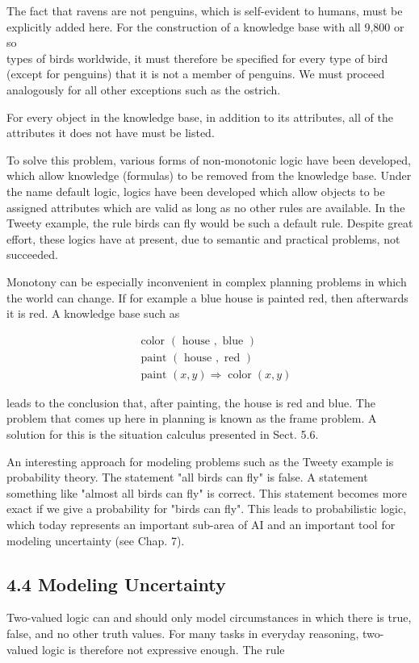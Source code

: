 \documentclass[10pt]{article}
\begin{document}
The fact that ravens are not penguins, which is self-evident to humans, must be explicitly added here. For the construction of a knowledge base with all 9,800 or so\\
types of birds worldwide, it must therefore be specified for every type of bird (except for penguins) that it is not a member of penguins. We must proceed analogously for all other exceptions such as the ostrich.

For every object in the knowledge base, in addition to its attributes, all of the attributes it does not have must be listed.

To solve this problem, various forms of non-monotonic logic have been developed, which allow knowledge (formulas) to be removed from the knowledge base. Under the name default logic, logics have been developed which allow objects to be assigned attributes which are valid as long as no other rules are available. In the Tweety example, the rule birds can fly would be such a default rule. Despite great effort, these logics have at present, due to semantic and practical problems, not succeeded.

Monotony can be especially inconvenient in complex planning problems in which the world can change. If for example a blue house is painted red, then afterwards it is red. A knowledge base such as

$$
\begin{aligned}
& \text { color }(\text { house }, \text { blue }) \\
& \text { paint }(\text { house }, \text { red }) \\
& \text { paint }(x, y) \Rightarrow \operatorname{color}(x, y)
\end{aligned}
$$

leads to the conclusion that, after painting, the house is red and blue. The problem that comes up here in planning is known as the frame problem. A solution for this is the situation calculus presented in Sect. 5.6.

An interesting approach for modeling problems such as the Tweety example is probability theory. The statement "all birds can fly" is false. A statement something like "almost all birds can fly" is correct. This statement becomes more exact if we give a probability for "birds can fly". This leads to probabilistic logic, which today represents an important sub-area of AI and an important tool for modeling uncertainty (see Chap. 7).

\subsection*{4.4 Modeling Uncertainty}
Two-valued logic can and should only model circumstances in which there is true, false, and no other truth values. For many tasks in everyday reasoning, two-valued logic is therefore not expressive enough. The rule
\end{document}
